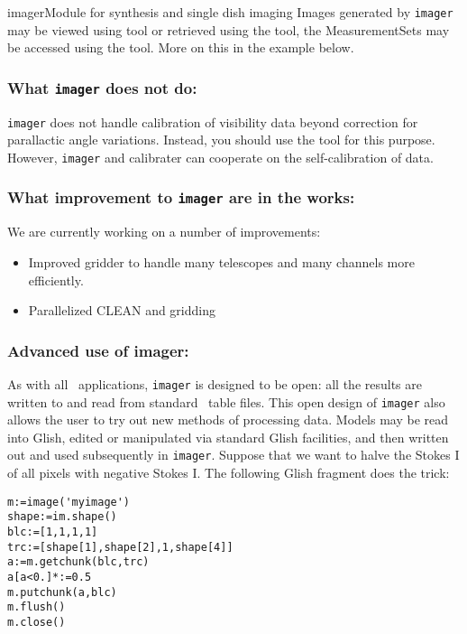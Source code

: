 \begin{ahmodule}{imager}{Module for synthesis and single dish imaging}
Images generated by {\tt imager} may be viewed using
 tool or retrieved using the
 tool, the MeasurementSets may be accessed
using the  tool. More on this in the example below.

\subsubsection*{What {\tt imager} does not do:}

{\tt imager} does not handle calibration of visibility data beyond correction
for parallactic angle variations.  Instead, you should use the
 tool for this purpose.  However, {\tt imager} and calibrater can
cooperate on the self-calibration of data. 

\subsubsection*{What improvement to {\tt imager} are in the works:}

We are currently working on a number of improvements:

\begin{itemize}
\item Improved gridder to handle many telescopes and many channels
more efficiently.
\item Parallelized CLEAN and gridding
\end{itemize}

\subsubsection*{Advanced use of imager:}

As with all \aipspp\ applications, {\tt imager} is designed to be open: all
the results are written to and read from standard \aipspp\ table files.
This open design of {\tt imager} also allows the user to try out new
methods of processing data.  Models may be read into Glish, edited or
manipulated via standard Glish facilities, and then written out and
used subsequently in {\tt imager}.  Suppose that we want to halve the
Stokes I of all pixels with negative Stokes I. The following Glish
fragment does the trick:
\begin{verbatim}
m:=image('myimage')
shape:=im.shape()
blc:=[1,1,1,1]
trc:=[shape[1],shape[2],1,shape[4]]
a:=m.getchunk(blc,trc)
a[a<0.]*:=0.5
m.putchunk(a,blc)
m.flush()
m.close()
\end{verbatim}


\end{ahmodule}
